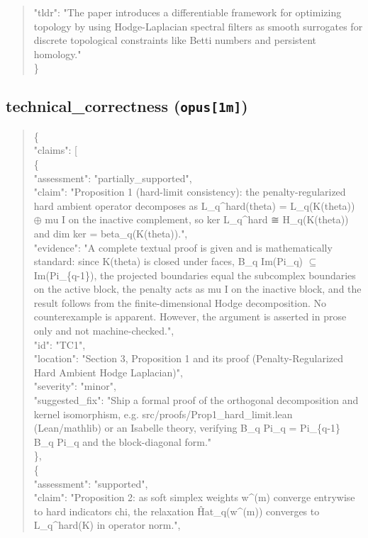 \documentclass[11pt]{article}
\begin{document}
\begin{quote}
  "tldr": "The paper introduces a differentiable framework for optimizing topology by using Hodge-Laplacian spectral filters as smooth surrogates for discrete topological constraints like Betti numbers and persistent homology."\\
\}\\
\end{quote}

\subsection*{technical\_correctness (\texttt{opus[1m]})}
\begin{quote}\small\ttfamily\raggedright
\{\\
  "claims": [\\
    \{\\
      "assessment": "partially\_supported",\\
      "claim": "Proposition 1 (hard-limit consistency): the penalty-regularized hard ambient operator decomposes as L\_q\^{}hard(theta) = L\_q(K(theta)) \ensuremath{\oplus} mu I on the inactive complement, so ker L\_q\^{}hard ≅ H\_q(K(theta)) and dim ker = beta\_q(K(theta)).",\\
      "evidence": "A complete textual proof is given and is mathematically standard: since K(theta) is closed under faces, B\_q Im(Pi\_q) \ensuremath{\subseteq} Im(Pi\_\{q-1\}), the projected boundaries equal the subcomplex boundaries on the active block, the penalty acts as mu I on the inactive block, and the result follows from the finite-dimensional Hodge decomposition. No counterexample is apparent. However, the argument is asserted in prose only and not machine-checked.",\\
      "id": "TC1",\\
      "location": "Section 3, Proposition 1 and its proof (Penalty-Regularized Hard Ambient Hodge Laplacian)",\\
      "severity": "minor",\\
      "suggested\_fix": "Ship a formal proof of the orthogonal decomposition and kernel isomorphism, e.g. src/proofs/Prop1\_hard\_limit.lean (Lean/mathlib) or an Isabelle theory, verifying B\_q Pi\_q = Pi\_\{q-1\} B\_q Pi\_q and the block-diagonal form."\\
    \},\\
    \{\\
      "assessment": "supported",\\
      "claim": "Proposition 2: as soft simplex weights w\^{}(m) converge entrywise to hard indicators chi, the relaxation Ĥat\_q(w\^{}(m)) converges to L\_q\^{}hard(K) in operator norm.",\\

\end{quote}
\end{document}
